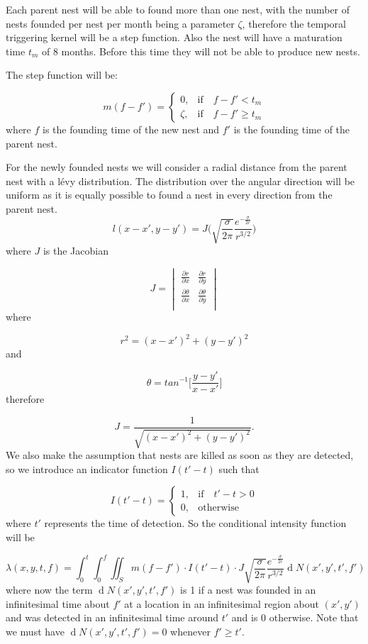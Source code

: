 \documentclass[11pt,a4paper]{article}
\renewcommand{\d}[1]{\ensuremath{\operatorname{d}\!{#1}}}
\begin{document}
Each parent nest will be able to found more than one nest, with the number of nests founded per nest per month being a parameter $\zeta$, therefore the temporal triggering kernel will be a step function. Also the nest will have a maturation time $t_m$ of 8 months. Before this time they will not be able to produce new nests. 

The step function will be:


\[
m (f - f') =
\begin{cases}
0, & \mbox{if} \quad f - f' < t_{m} \\
\zeta, & \mbox{if} \quad f - f' \geq t_{m}
\end{cases}
\]
where $f$ is the founding time of the new nest and $f'$ is the founding time of the parent nest.

For the newly founded nests we will consider a radial distance from the parent nest with a {\color{red}l\'evy distribution}. The distribution over the angular direction will be uniform as it is equally possible to found a nest in every direction from the parent nest.
{\color{red}
\begin{equation}
l(x - x', y - y')= J \bigg(\sqrt{\frac{\sigma}{2 \pi}} \frac{e^{- \frac{\sigma}{ 2 r}}}{r^{3/2}}\bigg)
\end{equation}}
where $J$ is the Jacobian

\[
J =  
\begin{vmatrix}
	\frac{\partial r}{\partial x} & \frac{\partial r}{\partial y} \\
	\frac{\partial \theta}{\partial x} & \frac{\partial \theta}{\partial y} \\
\end{vmatrix}
\]
where

\[
r^{2} = (x - x')^{2} + (y - y')^{2}
\]
and

\[
\theta = tan^{-1} \Bigg [\frac{y - y'}{x - x'} \Bigg ]
\]
therefore

\[
J = \frac{1}{\sqrt{(x - x')^{2} + (y - y')^{2}}}.
\]
We also make the assumption that nests are killed as soon as they are detected, so we introduce an indicator function $I(t' - t)$ such that

\[
I (t' - t) =
\begin{cases}
1, & \mbox{if} \quad t' -  t> 0 \\
0, & \mbox{otherwise}
\end{cases}
\]
where $t'$ represents the time of detection. So the conditional intensity function will be

\[
\lambda(x, y, t, f) = \int_{0}^{t} \int_{0}^{f} \iint_{S} m(f - f') \cdot I(t' - t)\cdot J \sqrt{\frac{\sigma}{2 \pi}} \frac{e^{- \frac{\sigma}{ 2 r}}}{r^{3/2}} \d N(x',y',t',f')
\]
where now the term $\d N(x',y',t',f')$ is 1 if a nest was founded in an infinitesimal time about $f'$ at a location in an infinitesimal region about $(x', y')$ and was detected in an infinitesimal time around $t'$ and is $0$ otherwise. Note that we must have $\d N(x',y',t',f')=0$ whenever $f' \geq t'$.
\end{document}
